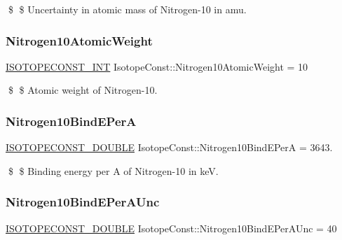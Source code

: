 \$ \$ Uncertainty in atomic mass of Nitrogen-\/10 in amu. \mbox{\label{group___isotope_const-_nitrogen-_n10_ga45b0755636b58c8fc0fd3acde24c2d6b}} 
\subsubsection{\texorpdfstring{Nitrogen10\+Atomic\+Weight}{Nitrogen10AtomicWeight}}
{\footnotesize\ttfamily \mbox{\hyperlink{group___isotope_const-_macros_ga5f18360b3e99483a35c32d789e62621c}{I\+S\+O\+T\+O\+P\+E\+C\+O\+N\+S\+T\+\_\+\+I\+NT}} Isotope\+Const\+::\+Nitrogen10\+Atomic\+Weight = 10}

\$ \$ Atomic weight of Nitrogen-\/10. \mbox{\label{group___isotope_const-_nitrogen-_n10_ga85e033f0bfc50f685e1adc9ad84bca3b}} 
\subsubsection{\texorpdfstring{Nitrogen10\+Bind\+E\+PerA}{Nitrogen10BindEPerA}}
{\footnotesize\ttfamily \mbox{\hyperlink{group___isotope_const-_macros_ga8f45a7272ce02c0b4c65c44636ed719a}{I\+S\+O\+T\+O\+P\+E\+C\+O\+N\+S\+T\+\_\+\+D\+O\+U\+B\+LE}} Isotope\+Const\+::\+Nitrogen10\+Bind\+E\+PerA = 3643.}

\$ \$ Binding energy per A of Nitrogen-\/10 in keV. \mbox{\label{group___isotope_const-_nitrogen-_n10_ga72f811797478934deb06831485c2b166}} 
\subsubsection{\texorpdfstring{Nitrogen10\+Bind\+E\+Per\+A\+Unc}{Nitrogen10BindEPerAUnc}}
{\footnotesize\ttfamily \mbox{\hyperlink{group___isotope_const-_macros_ga8f45a7272ce02c0b4c65c44636ed719a}{I\+S\+O\+T\+O\+P\+E\+C\+O\+N\+S\+T\+\_\+\+D\+O\+U\+B\+LE}} Isotope\+Const\+::\+Nitrogen10\+Bind\+E\+Per\+A\+Unc = 40}

